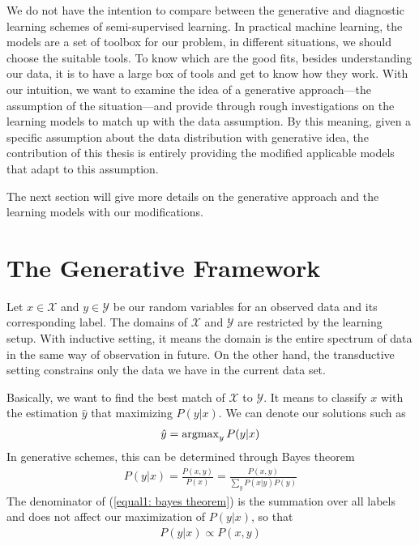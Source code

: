 We do not have the intention to compare between the generative and diagnostic learning schemes of semi-supervised learning. In practical machine learning, the models are a set of toolbox for our problem, in different situations, we should choose the suitable tools. To know which are the good fits, besides understanding our data, it is to have a large box of tools and get to know how they work. With our intuition, we want to examine the idea of a generative approach---the assumption of the situation---and provide through rough investigations on the learning models to match up with the data assumption. By this meaning, given a specific assumption about the data distribution with generative idea, the contribution of this thesis is entirely providing the modified applicable models that adapt to this assumption.

The next section will give more details on the generative approach and the learning models with our modifications.

\section{The Generative Framework}
Let $x \in \mathcal{X}$ and $y \in \mathcal{Y}$ be our random variables for an observed data and its corresponding label. The domains of $\mathcal{X}$ and $\mathcal{Y}$ are restricted by the learning setup. With inductive setting, it means the domain is the entire spectrum of data in the same way of observation in future. On the other hand, the transductive setting constrains only the data we have in the current data set.

Basically, we want to find the best match of $\mathcal{X}$ to $\mathcal{Y}$. It means to classify $x$ with the estimation $\hat{y}$ that maximizing $P(y | x)$. We can denote our solutions such as
\begin{align}
	\hat{y}=\operatorname{argmax}_y{P(y | x)}
\end{align}
In generative schemes, this can be determined through Bayes theorem
\begin{align}
	\label{equal1: bayes theorem}
	P(y | x)=\frac{P(x, y)}{P(x)} = \frac{P(x, y)}{\sum_{y}{P(x | y)P(y)}}
\end{align}
The denominator of (\ref{equal1: bayes theorem}) is the summation over all labels and does not affect our maximization of $P(y | x)$, so that
\begin{align}
	P(y | x) \propto P(x, y)
\end{align}

